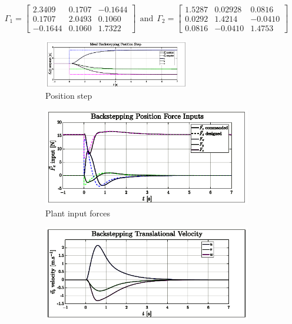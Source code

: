 \begin{equation}\label{eq:optimized-Position-IBC}
\Gamma_1 = \begin{bmatrix*}
2.3409 & 0.1707 & -0.1644\\
0.1707 & 2.0493 & 0.1060\\
-0.1644 & 0.1060 & 1.7322
\end{bmatrix*}
~~\text{and}~~\Gamma_2= \begin{bmatrix*}
1.5287 & 0.02928 & 0.0816\\
0.0292 & 1.4214 & -0.0410\\
0.0816 & -0.0410 & 1.4753
\end{bmatrix*}
\end{equation}
\begin{figure}[htbp]
\vspace{-20pt}
\centering
\begin{subfigure}{\textwidth}
\centering
\includegraphics[width=0.7\textwidth]{graphs/IBC_Position_Step}
\vspace{-6pt}
\caption{Position step}
\label{fig:IBC_Position_Step}
\end{subfigure}
\begin{subfigure}{0.49\textwidth}
\centering
\includegraphics[width=\textwidth]{graphs/IBC_Position_Force}
\vspace{-20pt}
\caption{Plant input forces}
\label{fig:IBC_Position_Force}
\end{subfigure}
\begin{subfigure}{0.49\textwidth}
\centering
\includegraphics[width=\textwidth]{graphs/IBC_Position_Velocity}

\end{subfigure}
\end{figure}
